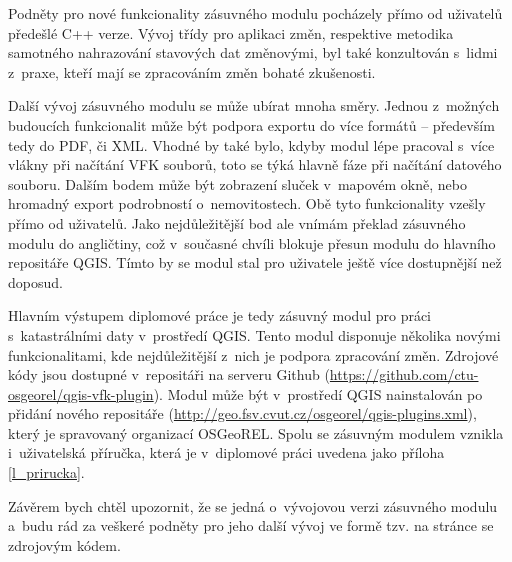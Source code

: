 \documentclass[a4paper,12pt,oneside]{book}
\begin{document}
Podněty pro nové funkcionality zásuvného modulu pocházely přímo od uživatelů předešlé C++ verze. Vývoj třídy pro aplikaci změn, respektive metodika samotného nahrazování stavových dat změnovými, byl také konzultován s~lidmi z~praxe, kteří mají se zpracováním změn bohaté zkušenosti.

Další vývoj zásuvného modulu se může ubírat mnoha směry. Jednou z~možných budoucích funkcionalit může být podpora exportu do více formátů -- především tedy do PDF, či XML. Vhodné by také bylo, kdyby modul lépe pracoval s~více vlákny při načítání VFK souborů, toto se týká hlavně fáze při načítání datového souboru. Dalším bodem může být zobrazení sluček v~mapovém okně, nebo hromadný export podrobností o~nemovitostech. Obě tyto funkcionality vzešly přímo od uživatelů. Jako nejdůležitější bod ale vnímám překlad zásuvného modulu do angličtiny, což v~současné chvíli blokuje přesun modulu do hlavního repositáře QGIS. Tímto by se modul stal pro uživatele ještě více dostupnější než doposud.

Hlavním výstupem diplomové práce je tedy zásuvný modul pro práci s~katastrálními daty v~prostředí QGIS. Tento modul disponuje několika novými funkcionalitami, kde nejdůležitější z~nich je podpora zpracování změn. Zdrojové kódy jsou dostupné v~repositáři na serveru Github (\url{https://github.com/ctu-osgeorel/qgis-vfk-plugin}). Modul může být v~prostředí QGIS nainstalován po přidání nového repositáře (\url{http://geo.fsv.cvut.cz/osgeorel/qgis-plugins.xml}), který je spravovaný organizací OSGeoREL. Spolu se zásuvným modulem vznikla i~uživatelská příručka, která je v~diplomové práci uvedena jako příloha \ref{l_prirucka}.

Závěrem bych chtěl upozornit, že se jedná o~vývojovou verzi zásuvného modulu a~budu rád za veškeré podněty pro jeho další vývoj ve formě tzv.  na stránce se zdrojovým kódem. 


\clearpage
\rhead{{\rightmark}}	%
\renewcommand{\refname}{Použitá literatura}



\clearpage
\listoffigures

\clearpage
\listoftables

\clearpage
\lstlistoflistings
\end{document}
